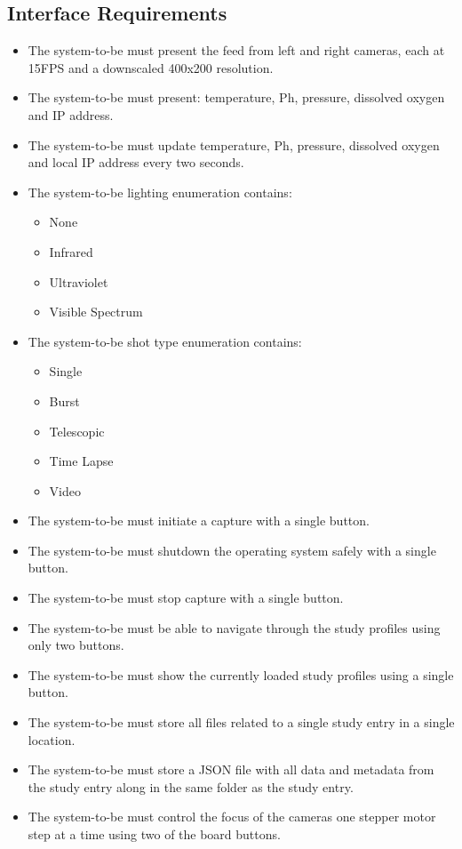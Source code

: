 \subsection{Interface Requirements}
\begin{itemize}
	\item The system-to-be must present the feed from left and right cameras, each at 15FPS and a downscaled 400x200 resolution.
	\item The system-to-be must present: temperature, Ph, pressure, dissolved oxygen and IP address.
	\item The system-to-be must update temperature, Ph, pressure, dissolved oxygen and local IP address every two seconds.
        \item The system-to-be lighting enumeration contains:
          \begin{itemize}
          \item None
          \item Infrared
          \item Ultraviolet
          \item Visible Spectrum
          \end{itemize}
        \item The system-to-be shot type enumeration contains:
          \begin{itemize}
          \item Single
          \item Burst
          \item Telescopic
          \item Time Lapse
          \item Video
          \end{itemize}
	\item The system-to-be must initiate a capture with a single button.
	\item The system-to-be must shutdown the operating system safely with a single button.
	\item The system-to-be must stop capture with a single button.
	\item The system-to-be must be able to navigate through the study profiles using only two buttons.
	\item The system-to-be must show the currently loaded study profiles using a single button.
	\item The system-to-be must store all files related to a single study entry in a single location.
        \item The system-to-be must store a JSON file with all data and metadata from the study entry along in the same folder as the study entry.
	\item The system-to-be must control the focus of the cameras one stepper motor step at a time using two of the board buttons.
\end{itemize}